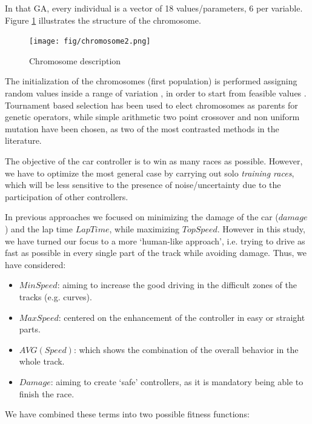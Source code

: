 \documentclass[conference]{IEEEtran}
\begin{document}
In that GA, every individual is a vector of 18 values/parameters, 6 per variable. Figure \ref {fig:cromosome} illustrates the structure of the chromosome.
\begin{figure}[!ht]	
  \begin{center}
    \texttt{[image: fig/chromosome2.png]}
    \caption{Chromosome description}
    \label{fig:cromosome}	
  \end{center}	
\end{figure}

The initialization of the chromosomes (first population) is performed
assigning random values inside a range of variation
\cite{GAs_Goldberg89}, in order to start from feasible values
\cite{evo17}. 
Tournament based selection has been used to elect chromosomes as
parents for genetic operators, while simple arithmetic two point
crossover \cite{crossGA2017} and non uniform mutation
\cite{mutation1997} have been chosen, as two of the most contrasted
methods in the literature. 



The objective of the car controller is to win as many races as
possible. However, we have to optimize the most general case by
carrying out solo {\em training races}, which will be less sensitive to the presence of noise/uncertainty due to the participation of other controllers.

In previous approaches we focused on minimizing the damage of
the car ($damage$) and the lap time $LapTime$, while
maximizing $TopSpeed$. However in this study, we have turned our focus to a more `human-like approach', i.e. trying to drive as fast as possible in every single part of the track while avoiding damage. Thus, we have considered:
\begin{itemize}
\item $MinSpeed$: aiming to increase the good driving in the difficult zones of the tracks (e.g. curves).
\item $MaxSpeed$: centered on the enhancement of the controller in easy or straight parts.
\item $AVG(Speed)$: which shows the combination of the overall behavior in the whole track.
\item $Damage$: aiming to create `safe' controllers, as it is mandatory being able to finish the race.
\end{itemize} 
%
We have combined these terms into two possible fitness functions:
\end{document}

